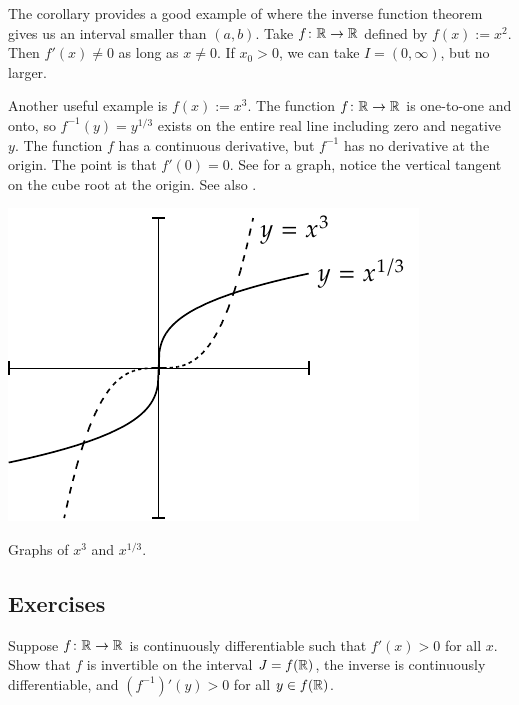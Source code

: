 \begin{example}
The corollary provides a good example of where the inverse function theorem
gives us an interval smaller than $(a,b)$.  Take $f \colon {\mathbb{R}} \to {\mathbb{R}}$
defined by $f(x) := x^2$.  Then $f'(x) \not= 0$
as long as $x \not= 0$.  If $x_0 > 0$, we can take $I=(0,\infty)$, but
no larger.
\end{example}

\begin{example}
Another useful example is $f(x) := x^3$.  The function $f \colon {\mathbb{R}} \to {\mathbb{R}}$ is
one-to-one and onto, so $f^{-1}(y) = y^{1/3}$ exists on the entire real
line including zero and negative $y$.  The function $f$ has
a continuous derivative, but $f^{-1}$ has no derivative at the origin.  The
point is that $f'(0) = 0$.  See  for a graph,
notice the vertical tangent on the cube root at the origin.
See also .
\begin{myfigureht}
\includegraphics{figures/cubecuberoot}
\caption{Graphs of $x^3$ and $x^{1/3}$.\label{cubecuberootfig}}
\end{myfigureht}
\end{example}


\subsection{Exercises}

\begin{exercise}
Suppose $f \colon {\mathbb{R}} \to {\mathbb{R}}$ is continuously differentiable such that
$f'(x) > 0$ for all $x$.  Show that $f$ is invertible on the interval $J =
f({\mathbb{R}})$, the inverse is continuously differentiable, and ${(f^{-1})}'(y) >
0$ for all $y \in f({\mathbb{R}})$.
\end{exercise}

